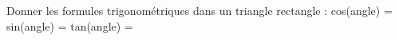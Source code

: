 \documentclass[exercice]{thedocument}%
\begin{document}
%
Donner les formules trigonométriques dans un triangle rectangle :\vskip20pt
cos(angle) =\vskip30pt
sin(angle) =\vskip30pt
tan(angle) =\vskip30pt
\end{document}
